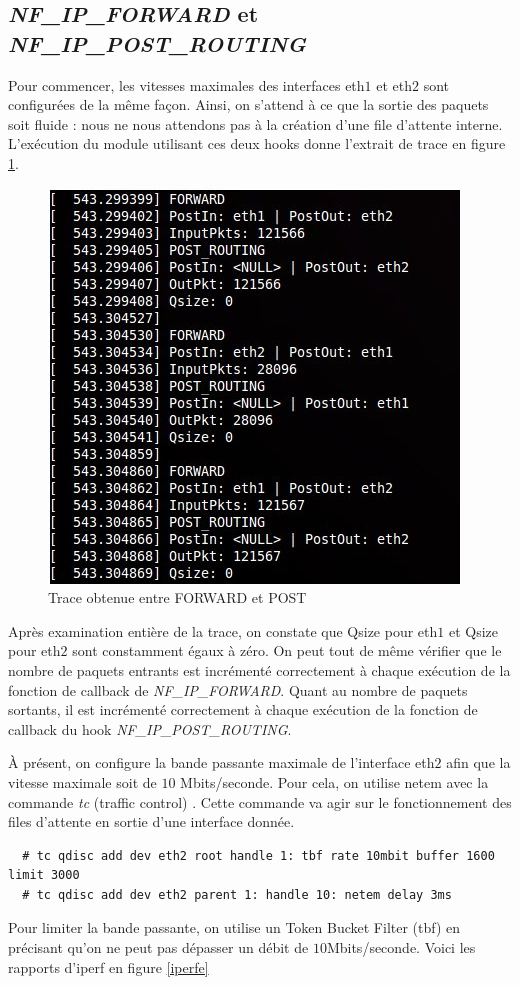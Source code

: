 \documentclass[a4paper]{article}
\begin{document}
\subsection{\textit{NF\_IP\_FORWARD} et \textit{NF\_IP\_POST\_ROUTING}}
Pour commencer, les vitesses maximales des interfaces eth$1$ et
eth$2$ sont configurées de la même façon. Ainsi, on s'attend à
ce que la sortie des paquets soit fluide : nous ne nous attendons
pas à la création d'une file d'attente interne. L'exécution du module
utilisant ces deux hooks donne l'extrait de trace en
figure \ref{forwardpost}.

\begin{figure}[!ht]
	\centering
	\includegraphics[scale=.5]{forward_post.jpg}
	\caption{\label{forwardpost} Trace obtenue entre FORWARD et POST}
\end{figure}

Après examination entière de la trace, on constate que Qsize
pour eth$1$ et Qsize pour eth$2$ sont constamment égaux à zéro.
On peut tout de même vérifier que le nombre de paquets entrants
est incrémenté correctement à chaque exécution de la fonction
de callback de \textit{NF\_IP\_FORWARD}. Quant au nombre de paquets
sortants, il est incrémenté correctement à chaque exécution de la
fonction de callback du hook \textit{NF\_IP\_POST\_ROUTING}.

À présent, on configure la bande passante maximale de l'interface
eth$2$ afin que la vitesse maximale soit de $10$ Mbits/seconde.
Pour cela, on utilise netem \cite{netem} avec la commande \textit{tc} (traffic control) \cite{tc1} \cite{tcman}.
Cette commande va agir sur le fonctionnement des files d’attente
en sortie d’une interface donnée.
\begin{verbatim}
  # tc qdisc add dev eth2 root handle 1: tbf rate 10mbit buffer 1600 limit 3000
  # tc qdisc add dev eth2 parent 1: handle 10: netem delay 3ms
\end{verbatim}
Pour limiter la bande passante, on utilise un Token Bucket Filter
(tbf) en précisant qu’on ne peut pas dépasser un débit de
$10$Mbits/seconde. Voici les rapports d'iperf en figure \ref{iperfe}
\end{document}
